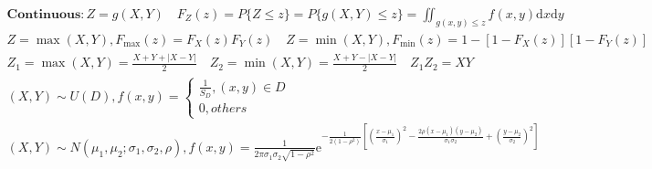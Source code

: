 \documentclass{article}
\begin{document}
\begin{align*}
    \mathbf{Continuous} : Z = g(X,Y) \quad F_{Z}(z)=P\{Z\le z\} = P\{g(X,Y)\le z\} = \iint_{g(x,y)\le z}f(x,y)\mathrm{d}x\mathrm{d}y \\
    Z=\max(X,Y),F_{\max}(z)=F_{X}(z)F_{Y}(z) \quad Z=\min(X,Y),F_{\min}(z)=1-[1-F_{X}(z)][1-F_{Y}(z)] \\ 
    Z_{1}=\max(X,Y) = \frac{X+Y+|X-Y|}{2} \quad Z_{2}=\min(X,Y)=\frac{X+Y-|X-Y|}{2} \quad Z_{1}Z_{2}=XY \\ 
    (X,Y) \sim U(D), 
    f(x,y) = \left\{ 
    \begin{array}{rl} 
        \frac{1}{S_{D}}, (x,y) \in D\\ 
        0, others
    \end{array} \right. \ \\ 
    (X,Y) \sim N(\mu_{1},\mu_{2};\sigma_{1},\sigma_{2},\rho),f(x,y) = \frac{1}{2\pi \sigma_{1} \sigma_{2} \sqrt{1-\rho^2}} \mathrm{e}^{-\frac{1}{2(1-\rho^2)}[(\frac{x-\mu_{1}}{\sigma_{1}})^2-\frac{2\rho (x-\mu_{1})(y-\mu_{2})}{\sigma_{1}\sigma_{2}}+(\frac{y-\mu_{2}}{\sigma_{2}})^2]} \\
\end{align*}

\clearpage
\end{document}
